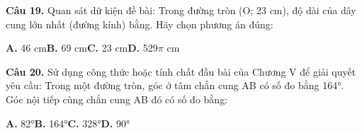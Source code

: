 \documentclass[11pt,a4paper]{article}
\begin{document}
\textbf{\color{primary} Câu 19.} Quan sát dữ kiện đề bài: Trong đường tròn (O; 23 cm), độ dài của dây cung lớn nhất (đường kính) bằng. Hãy chọn phương án đúng:\par
\hspace*{1.5em}\textbf{A.} 46 cm\quad\quad \textbf{B.} 69 cm\quad\quad \textbf{C.} 23 cm\quad\quad \textbf{D.} 529$\pi$ cm\par\vspace{2pt}
\textbf{\color{primary} Câu 20.} Sử dụng công thức hoặc tính chất đầu bài của Chương V để giải quyết yêu cầu: Trong một đường tròn, góc ở tâm chắn cung AB có số đo bằng 164°. Góc nội tiếp cùng chắn cung AB đó có số đo bằng:\par
\hspace*{1.5em}\textbf{A.} 82°\quad\quad \textbf{B.} 164°\quad\quad \textbf{C.} 328°\quad\quad \textbf{D.} 90°\par\vspace{2pt}
\end{document}

